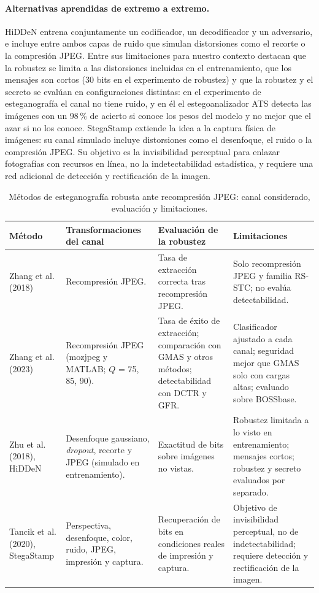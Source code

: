 \documentclass[IB]{TFUOC}%
\begin{document}
\paragraph{Alternativas aprendidas de extremo a extremo.} HiDDeN \cite{zhu2018hidden} entrena conjuntamente un codificador, un decodificador y un adversario, e incluye entre ambos capas de ruido que simulan distorsiones como el recorte o la compresión JPEG. Entre sus limitaciones para nuestro contexto destacan que la robustez se limita a las distorsiones incluidas en el entrenamiento, que los mensajes son cortos (30 bits en el experimento de robustez) y que la robustez y el secreto se evalúan en configuraciones distintas: en el experimento de esteganografía el canal no tiene ruido, y en él el estegoanalizador ATS \cite{lerch2016ats} detecta las imágenes con un 98\,\% de acierto si conoce los pesos del modelo y no mejor que el azar si no los conoce. StegaStamp \cite{tancik2020stegastamp} extiende la idea a la captura física de imágenes: su canal simulado incluye distorsiones como el desenfoque, el ruido o la compresión JPEG. Su objetivo es la invisibilidad perceptual para enlazar fotografías con recursos en línea, no la indetectabilidad estadística, y requiere una red adicional de detección y rectificación de la imagen.

\begin{table}[H]
\centering
\scriptsize
\caption{Métodos de esteganografía robusta ante recompresión JPEG: canal considerado, evaluación y limitaciones.}
\label{tab:robustez_metodos}
\begin{tabular}{|p{2.3cm}|p{3.3cm}|p{4.7cm}|p{4.3cm}|}
\hline
\rowcolor{uocnavy}
\color{white}\textbf{Método} &
\color{white}\textbf{Transformaciones del canal} &
\color{white}\textbf{Evaluación de la robustez} &
\color{white}\textbf{Limitaciones} \\
\hline
Zhang et al. (2018) \cite{20} &
Recompresión JPEG. &
Tasa de extracción correcta tras recompresión JPEG. &
Solo recompresión JPEG y familia RS-STC; no evalúa detectabilidad. \\
\hline
Zhang et al. (2023) \cite{18} &
Recompresión JPEG (mozjpeg y MATLAB; $Q$ = 75, 85, 90). &
Tasa de éxito de extracción; comparación con GMAS y otros métodos; detectabilidad con DCTR y GFR. &
Clasificador ajustado a cada canal; seguridad mejor que GMAS solo con cargas altas; evaluado sobre BOSSbase. \\
\hline
Zhu et al. (2018), HiDDeN \cite{zhu2018hidden} &
Desenfoque gaussiano, \textit{dropout}, recorte y JPEG (simulado en entrenamiento). &
Exactitud de bits sobre imágenes no vistas. &
Robustez limitada a lo visto en entrenamiento; mensajes cortos; robustez y secreto evaluados por separado. \\
\hline
Tancik et al. (2020), StegaStamp \cite{tancik2020stegastamp} &
Perspectiva, desenfoque, color, ruido, JPEG, impresión y captura. &
Recuperación de bits en condiciones reales de impresión y captura. &
Objetivo de invisibilidad perceptual, no de indetectabilidad; requiere detección y rectificación de la imagen. \\
\hline
\end{tabular}
\end{table}
\end{document}
